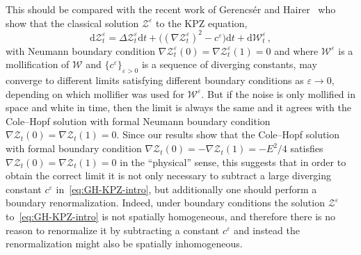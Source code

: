 \documentclass[AHL,Unicode,longabstracts]{cedram}
\newcommand{\mc}[1]{{\mathcal #1}}
\renewcommand{\mc}[1]{{\mathcal #1}}
\newcommand*{\dd}{\mathrm{d}}
\newcommand*{\dt}{\dd t}
\begin{document}
This should be compared with the recent work of Gerencs\'er and Hairer~\cite{Gerencser2018} who show that the classical solution $\mc Z^\varepsilon$ to the KPZ equation,
\begin{equation}\label{eq:GH-KPZ-intro}
\dd\mc Z^\varepsilon_t = \Delta \mc Z^\varepsilon_t \dt + \big((\nabla\mc Z^\varepsilon_t)^2 - c^\varepsilon\big) \dt + \dd\mc W^\varepsilon_t \,,
\end{equation}
with Neumann boundary condition $\nabla \mc Z^\varepsilon_t(0) = \nabla \mc Z^\varepsilon_t(1) = 0$ and where $\mc W^\varepsilon$ is a mollification of $\mc W$ and $\{c^\varepsilon\}_{\varepsilon>0}$ is a sequence of diverging constants, may converge to different limits satisfying different boundary conditions as $\varepsilon \to 0$, depending on which mollifier was used for $\mc W^\varepsilon$. But if the noise is only mollified in space and white in time, then the limit is always the same and it agrees with the Cole--Hopf solution with formal Neumann boundary condition $\nabla \mc Z_t(0) = \nabla \mc Z_t(1) = 0$. Since our results show that the Cole--Hopf solution with formal boundary condition $\nabla \mc Z_t(0) = -\nabla \mc Z_t(1) = -E^2/4$ satisfies $\nabla \mc Z_t(0) = \nabla \mc Z_t(1) = 0$ in the ``physical'' sense, this suggests that in order to obtain the correct limit it is not only necessary to subtract a large diverging constant $c^\varepsilon$ in~\eqref{eq:GH-KPZ-intro}, but additionally one should perform a boundary renormalization. Indeed, under boundary conditions the solution $\mc Z^\varepsilon$ to~\eqref{eq:GH-KPZ-intro} is not spatially homogeneous, and therefore there is no reason to renormalize it by subtracting a constant $c^\varepsilon$ and instead the renormalization might also be spatially inhomogeneous.
\end{document}

